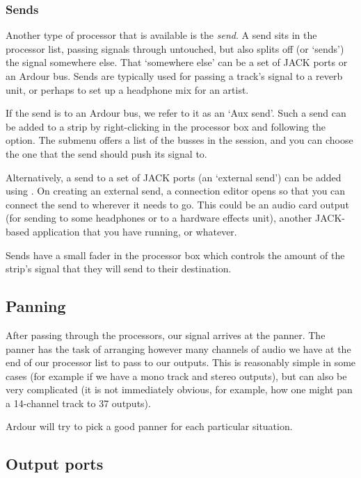 \documentclass[10pt,a4paper]{book}
\newcommand{\menu}[1]{\emph{\StrSubstitute{#1}{,}{ $\rightarrow$ }}}
\begin{document}
{\subsubsection{Sends}

Another type of processor that is available is the \emph{send}.  A
send sits in the processor list, passing signals through untouched,
but also splits off (or `sends') the signal somewhere else.  That
`somewhere else' can be a set of JACK ports or an Ardour bus.  Sends
are typically used for passing a track's signal to a reverb unit, or
perhaps to set up a headphone mix for an artist.

If the send is to an Ardour bus, we refer to it as an `Aux send'.
Such a send can be added to a strip by right-clicking in the processor
box and following the \menu{New Aux Send} option.  The submenu offers
a list of the busses in the session, and you can choose the one that
the send should push its signal to.

Alternatively, a send to a set of JACK ports (an `external send') can
be added using \menu{New External Send}.  On creating an external
send, a connection editor opens so that you can connect the send to
wherever it needs to go.  This could be an audio card output (for
sending to some headphones or to a hardware effects unit), another
JACK-based application that you have running, or whatever.

Sends have a small fader in the processor box which controls the
amount of the strip's signal that they will send to their destination.


\subsection{Panning}

After passing through the processors, our signal arrives at the
panner.  The panner has the task of arranging however many channels of
audio we have at the end of our processor list to pass to our outputs.
This is reasonably simple in some cases (for example if we have a mono
track and stereo outputs), but can also be very complicated (it is not
immediately obvious, for example, how one might pan a 14-channel track
to 37 outputs).

Ardour will try to pick a good panner for each particular situation.


\subsection{Output ports}

}
\end{document}
